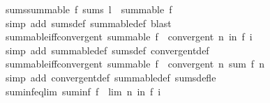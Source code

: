 \begin{isabellebody}
\isanewline
%
\endisadelimproof
\isanewline
{}\isamarkupfalse%
\ sums{\isacharunderscore}{\kern0pt}summable{\isacharcolon}{\kern0pt}\ {\isachardoublequoteopen}f\ sums\ l\ {\isasymLongrightarrow}\ summable\ f{\isachardoublequoteclose}\isanewline
%
\isadelimproof
\ \ %
\endisadelimproof
%
\isatagproof
{}\isamarkupfalse%
\ {\isacharparenleft}{\kern0pt}simp\ add{\isacharcolon}{\kern0pt}\ sums{\isacharunderscore}{\kern0pt}def\ summable{\isacharunderscore}{\kern0pt}def{\isacharcomma}{\kern0pt}\ blast{\isacharparenright}{\kern0pt}%
\endisatagproof
{\isafoldproof}%
%
\isadelimproof
\isanewline
%
\endisadelimproof
\isanewline
{}\isamarkupfalse%
\ summable{\isacharunderscore}{\kern0pt}iff{\isacharunderscore}{\kern0pt}convergent{\isacharcolon}{\kern0pt}\ {\isachardoublequoteopen}summable\ f\ {\isasymlongleftrightarrow}\ convergent\ {\isacharparenleft}{\kern0pt}{\isasymlambda}n{\isachardot}{\kern0pt}\ {\isasymSum}i{\isacharless}{\kern0pt}n{\isachardot}{\kern0pt}\ f\ i{\isacharparenright}{\kern0pt}{\isachardoublequoteclose}\isanewline
%
\isadelimproof
\ \ %
\endisadelimproof
%
\isatagproof
{}\isamarkupfalse%
\ {\isacharparenleft}{\kern0pt}simp\ add{\isacharcolon}{\kern0pt}\ summable{\isacharunderscore}{\kern0pt}def\ sums{\isacharunderscore}{\kern0pt}def\ convergent{\isacharunderscore}{\kern0pt}def{\isacharparenright}{\kern0pt}%
\endisatagproof
{\isafoldproof}%
%
\isadelimproof
\isanewline
%
\endisadelimproof
\isanewline
{}\isamarkupfalse%
\ summable{\isacharunderscore}{\kern0pt}iff{\isacharunderscore}{\kern0pt}convergent{\isacharprime}{\kern0pt}{\isacharcolon}{\kern0pt}\ {\isachardoublequoteopen}summable\ f\ {\isasymlongleftrightarrow}\ convergent\ {\isacharparenleft}{\kern0pt}{\isasymlambda}n{\isachardot}{\kern0pt}\ sum\ f\ {\isacharbraceleft}{\kern0pt}{\isachardot}{\kern0pt}{\isachardot}{\kern0pt}n{\isacharbraceright}{\kern0pt}{\isacharparenright}{\kern0pt}{\isachardoublequoteclose}\isanewline
%
\isadelimproof
\ \ %
\endisadelimproof
%
\isatagproof
{}\isamarkupfalse%
\ {\isacharparenleft}{\kern0pt}simp\ add{\isacharcolon}{\kern0pt}\ convergent{\isacharunderscore}{\kern0pt}def\ summable{\isacharunderscore}{\kern0pt}def\ sums{\isacharunderscore}{\kern0pt}def{\isacharunderscore}{\kern0pt}le{\isacharparenright}{\kern0pt}%
\endisatagproof
{\isafoldproof}%
%
\isadelimproof
\isanewline
%
\endisadelimproof
\isanewline
{}\isamarkupfalse%
\ suminf{\isacharunderscore}{\kern0pt}eq{\isacharunderscore}{\kern0pt}lim{\isacharcolon}{\kern0pt}\ {\isachardoublequoteopen}suminf\ f\ {\isacharequal}{\kern0pt}\ lim\ {\isacharparenleft}{\kern0pt}{\isasymlambda}n{\isachardot}{\kern0pt}\ {\isasymSum}i{\isacharless}{\kern0pt}n{\isachardot}{\kern0pt}\ f\ i{\isacharparenright}{\kern0pt}{\isachardoublequoteclose}\isanewline

\end{isabellebody}
